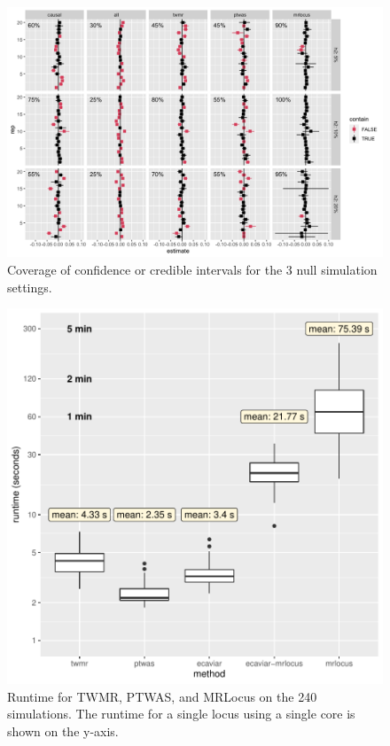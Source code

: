 \documentclass[11pt]{article}
\begin{document}
\begin{figure}[!ht]
  \centering
  \includegraphics[width=\textwidth]{figs/nullplot.png}
  \caption{Coverage of confidence or credible intervals for the 3 null
    simulation settings.}
\end{figure}

\begin{figure}[!ht]
  \centering
  \includegraphics[width=.7\textwidth]{figs/runtime}
  \caption{Runtime for TWMR, PTWAS, and MRLocus on the 240
    simulations. The runtime for a single locus using a single core is
    shown on the y-axis.}
\end{figure}
\end{document}
